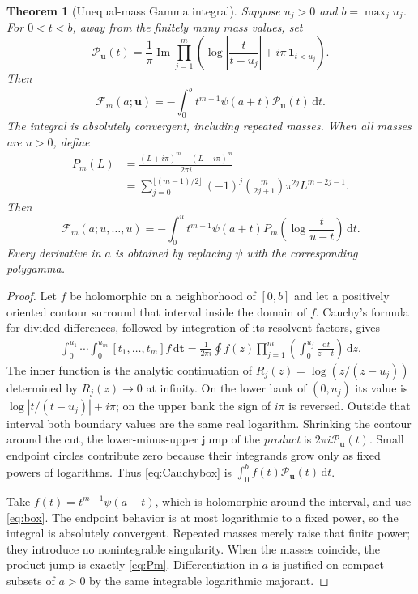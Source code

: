 \documentclass[11pt]{article}
\numberwithin{equation}{section}
\newtheorem{theorem}{Theorem}[section]
\theoremstyle{definition}\newtheorem{definition}[theorem]{Definition}
\theoremstyle{remark}\newtheorem{remark}[theorem]{Remark}
\newcommand{\dd}{\,\mathrm d}
\newcommand{\Ima}{\operatorname{Im}}
\newcommand{\bu}{\boldsymbol{u}}
\newcommand{\cF}{\mathcal F}
\begin{document}
\begin{theorem}[Unequal-mass Gamma integral]\label{thm:gammaint}
Suppose $u_j>0$ and $b=\max_j u_j$. For $0<t<b$, away from the finitely many mass values, set
\begin{equation}\label{eq:unequalP}
 \mathcal P_{\bu}(t)=\frac1\pi\Ima
 \prod_{j=1}^m\left(\log\left|\frac{t}{t-u_j}\right|
                 +i\pi\,\mathbf1_{t<u_j}\right).
\end{equation}
Then
\begin{equation}\label{eq:unequalGamma}
 \boxed{\qquad
 \cF_m(a;\bu)=-\int_0^b t^{m-1}\psi(a+t)\mathcal P_{\bu}(t)\dd t.
 \qquad}
\end{equation}
The integral is absolutely convergent, including repeated masses.
When all masses are $u>0$, define
\begin{align}\label{eq:Pm}
 P_m(L)&=\frac{(L+i\pi)^m-(L-i\pi)^m}{2\pi i}\\
 &=\sum_{j=0}^{\lfloor(m-1)/2\rfloor}(-1)^j\binom m{2j+1}
          \pi^{2j}L^{m-2j-1}.\nonumber
\end{align}
Then
\begin{equation}\label{eq:diagonalGamma}
 \boxed{\qquad
 \cF_m(a;u,\ldots,u)
 =-\int_0^u t^{m-1}\psi(a+t)P_m\left(\log\frac{t}{u-t}\right)\dd t.
 \qquad}
\end{equation}
Every derivative in $a$ is obtained by replacing $\psi$ with the corresponding polygamma.
\end{theorem}
\begin{proof}
Let $f$ be holomorphic on a neighborhood of $[0,b]$ and let a positively oriented contour surround that interval inside the domain of $f$. Cauchy's formula for divided differences, followed by integration of its resolvent factors, gives
\begin{align}\label{eq:Cauchybox}
 \int_0^{u_1}\cdots\int_0^{u_m}[t_1,\ldots,t_m]f\dd\bm t
 =\frac1{2\pi i}\oint f(z)\prod_{j=1}^m
        \left(\int_0^{u_j}\frac{\dd t}{z-t}\right)\dd z.
\end{align}
The inner function is the analytic continuation of
$R_j(z)=\log(z/(z-u_j))$ determined by $R_j(z)\to0$ at infinity. On the lower bank of $(0,u_j)$ its value is
$\log|t/(t-u_j)|+i\pi$; on the upper bank the sign of $i\pi$ is reversed. Outside that interval both boundary values are the same real logarithm. Shrinking the contour around the cut, the lower-minus-upper jump of the \emph{product} is $2\pi i\mathcal P_{\bu}(t)$. Small endpoint circles contribute zero because their integrands grow only as fixed powers of logarithms. Thus \eqref{eq:Cauchybox} is $\int_0^b f(t)\mathcal P_{\bu}(t)\dd t$.

Take $f(t)=t^{m-1}\psi(a+t)$, which is holomorphic around the interval, and use \eqref{eq:box}. The endpoint behavior is at most logarithmic to a fixed power, so the integral is absolutely convergent. Repeated masses merely raise that finite power; they introduce no nonintegrable singularity. When the masses coincide, the product jump is exactly \eqref{eq:Pm}. Differentiation in $a$ is justified on compact subsets of $a>0$ by the same integrable logarithmic majorant.
\end{proof}
\end{document}
